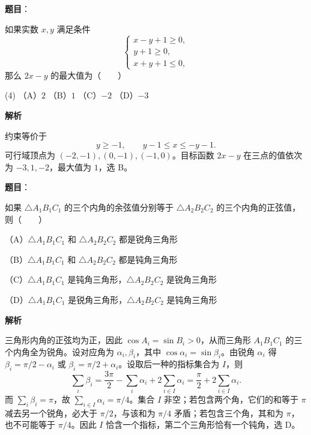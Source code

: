 \begin{answer}

\textbf{题目}：

如果实数 $x,y$ 满足条件
\nopagebreak[4]
\[
\begin{cases}
x-y+1\geqslant0,\\
y+1\geqslant0,\\
x+y+1\leqslant0,
\end{cases}
\]
那么 $2x-y$ 的最大值为\mbox{（　　）}

\begin{gkopts}(4)
\task （A）$2$
\task （B）$1$
\task （C）$-2$
\task （D）$-3$
\end{gkopts}

\textbf{解析}

约束等价于
\nopagebreak[4]
\[
y\ge-1,\qquad y-1\le x\le-y-1.
\]
可行域顶点为 $(-2,-1),(0,-1),(-1,0)$。目标函数 $2x-y$ 在三点的值依次为 $-3,1,-2$，最大值为 $1$，选 B。


\end{answer}
\begin{answer}

\textbf{题目}：

如果 $\triangle A_1B_1C_1$ 的三个内角的余弦值分别等于 $\triangle A_2B_2C_2$ 的三个内角的正弦值，则\mbox{（　　）}

（A）$\triangle A_1B_1C_1$ 和 $\triangle A_2B_2C_2$ 都是锐角三角形

（B）$\triangle A_1B_1C_1$ 和 $\triangle A_2B_2C_2$ 都是钝角三角形

（C）$\triangle A_1B_1C_1$ 是钝角三角形，$\triangle A_2B_2C_2$ 是锐角三角形

（D）$\triangle A_1B_1C_1$ 是锐角三角形，$\triangle A_2B_2C_2$ 是钝角三角形

\textbf{解析}

三角形内角的正弦均为正，因此 $\cos A_i=\sin B_i>0$，从而三角形 $A_1B_1C_1$ 的三个内角全为锐角。设对应角为 $\alpha_i,\beta_i$，其中 $\cos\alpha_i=\sin\beta_i$。由锐角 $\alpha_i$ 得 $\beta_i=\pi/2-\alpha_i$ 或 $\beta_i=\pi/2+\alpha_i$。设取后一种的指标集合为 $I$，则
\nopagebreak[4]
\[
\sum_i\beta_i=\frac{3\pi}{2}-\sum_i\alpha_i+2\sum_{i\in I}\alpha_i
=\frac\pi2+2\sum_{i\in I}\alpha_i.
\]
而 $\sum_i\beta_i=\pi$，故 $\sum_{i\in I}\alpha_i=\pi/4$。集合 $I$ 非空；若包含两个角，它们的和等于 $\pi$ 减去另一个锐角，必大于 $\pi/2$，与该和为 $\pi/4$ 矛盾；若包含三个角，其和为 $\pi$，也不可能等于 $\pi/4$。因此 $I$ 恰含一个指标，第二个三角形恰有一个钝角，选 D。


\end{answer}
